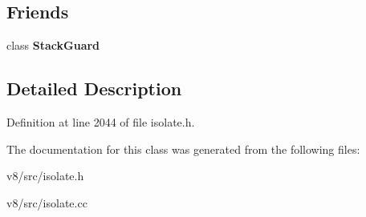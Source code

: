 \subsection*{Friends}
\begin{DoxyCompactItemize}
\item 
\mbox{\label{classv8_1_1internal_1_1InterruptsScope_a006f03b7efe2d351d5832ca878e89506}} 
class {\bfseries Stack\+Guard}
\end{DoxyCompactItemize}


\subsection{Detailed Description}


Definition at line 2044 of file isolate.\+h.



The documentation for this class was generated from the following files\+:\begin{DoxyCompactItemize}
\item 
v8/src/isolate.\+h\item 
v8/src/isolate.\+cc\end{DoxyCompactItemize}
